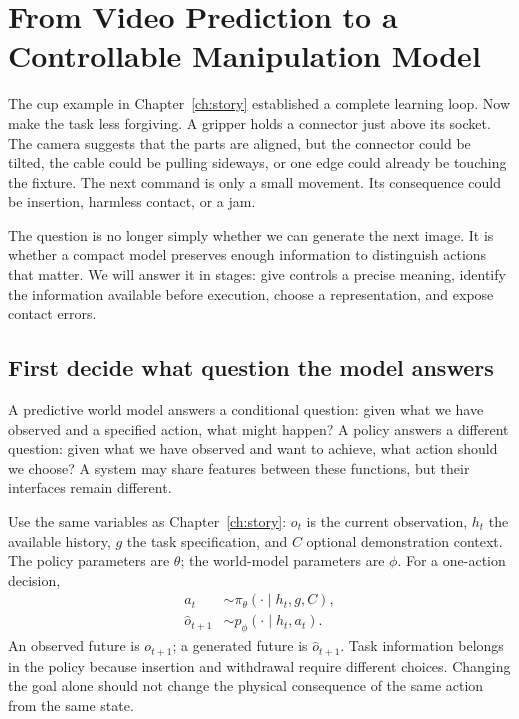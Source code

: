 \chapter{From Video Prediction to a Controllable Manipulation Model}
\label{ch:engineering}

The cup example in Chapter~\ref{ch:story} established a complete learning loop. Now make the task less forgiving. A gripper holds a connector just above its socket. The camera suggests that the parts are aligned, but the connector could be tilted, the cable could be pulling sideways, or one edge could already be touching the fixture. The next command is only a small movement. Its consequence could be insertion, harmless contact, or a jam.

The question is no longer simply whether we can generate the next image. It is whether a compact model preserves enough information to distinguish actions that matter. We will answer it in stages: give controls a precise meaning, identify the information available before execution, choose a representation, and expose contact errors.

\section{First decide what question the model answers}
A predictive world model answers a conditional question: given what we have observed and a specified action, what might happen? A policy answers a different question: given what we have observed and want to achieve, what action should we choose? A system may share features between these functions, but their interfaces remain different.

Use the same variables as Chapter~\ref{ch:story}: $o_t$ is the current observation, $h_t$ the available history, $g$ the task specification, and $C$ optional demonstration context. The policy parameters are $\theta$; the world-model parameters are $\phi$. For a one-action decision,
\begin{align}
 a_t &\sim \pi_\theta(\cdot\mid h_t,g,C), \label{eq:middle-policy}\\
 \widehat o_{t+1} &\sim p_\phi(\cdot\mid h_t,a_t). \label{eq:middle-world}
\end{align}
An observed future is $o_{t+1}$; a generated future is $\widehat o_{t+1}$. Task information belongs in the policy because insertion and withdrawal require different choices. Changing the goal alone should not change the physical consequence of the same action from the same state.

